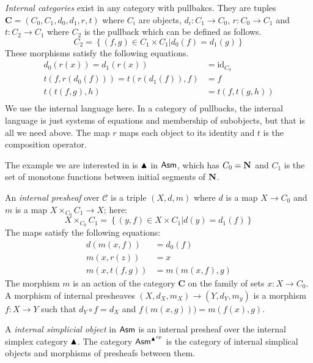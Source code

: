\documentclass{amsart}
\theoremstyle{plain}
\theoremstyle{definition}
\newcommand\hide[1]{}
\newcommand\cat\mathcal
\newcommand\set[1]{\left\{#1\right\}}
\newcommand\id{\mathrm{id}}
\begin{document}
\newcommand\intcat{\mathbf}
\emph{Internal categories} exist in any category with pullbakcs. They are tuples $\intcat C=(C_0,C_1,d_0,d_1,r,t)$ where $C_i$ are objects, $d_i:C_1\to C_0$, $r:C_0\to C_1$ and $t:C_2\to C_1$ where $C_2$ is the pullback which can be defined as follows. %
\[ C_2 = \set{(f,g)\in C_1\times C_1| d_0(f)=d_1(g) } \]
These morphisms satisfy the following equations.
\begin{align*}
d_0(r(x)) = d_1(r(x)) &= \id_{C_0}\\
t(f, r(d_0(f))) = t(r(d_1(f)),f) &= f\\
t(t(f,g),h) &= t(f,t(g,h))\\
\end{align*}
We use the internal language here. In a category of pullbacks, the internal language is just systems of equations and membership of subobjects, but that is all we need above. The map $r$ maps each object to its identity and $t$ is the composition operator.

The example we are interested in is $\blacktriangle$ in $\mathsf{Asm}$, which has $C_0 = \mathbf{N}$ and $C_1$ is the set of monotone functions between initial segments of $\mathbf{N}$. 

\hide{ waar gebruiken we deze? }

An \emph{internal presheaf} over $\cat C$ is a triple $(X,d,m)$ where $d$ is a map $X\to C_0$ and $m$ is a map $X\times_{C_0} C_1 \to X$; here:
\[ X\times_{C_0} C_1 = \set{(y,f)\in X\times C_1| d(y) = d_1(f)} \]
The maps satisfy the following equations:
\begin{align*}
d(m(x,f)) &= d_0(f) \\
m(x,r(z)) &= x\\
m(x,t(f,g)) &= m(m(x,f),g)
\end{align*}
The morphism $m$ is an action of the category $\intcat C$ on the family of sets $x:X\to C_0$.
A morphism of internal presheaves $(X,d_X,m_X) \to (Y,d_Y,m_y)$ is a morphism $f:X\to Y$ such that $d_Y\circ f = d_X$ and $f(m(x,g))) = m(f(x),g)$.

A \emph{internal simplicial object} in $\mathsf{Asm}$ is an internal presheaf over the internal simplex category $\blacktriangle$. The category $\mathsf{Asm}^{\blacktriangle^{op}}$ is the category of internal simplical objects and morphisms of presheafs between them.
\end{document}
